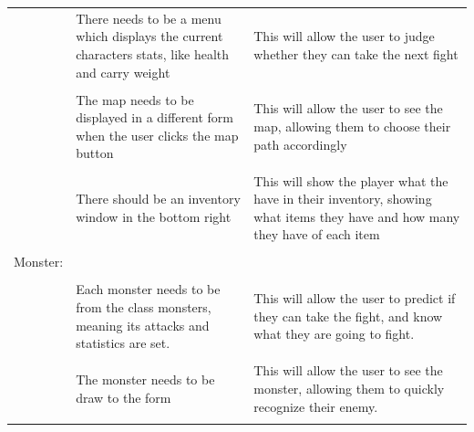\documentclass[12pt]{article}
\begin{document}
\begin{tabularx}{\linewidth}{XXX}
                        & There needs to be a menu which displays the current characters stats, like health and carry weight & This will allow the user to judge whether they can take the next fight                                                                                                                                                                             \\\\
                        & The map needs to be displayed in a different form when the user clicks the map button              & This will allow the user to see the map, allowing them to choose their path accordingly                                                                                                                                                            \\\\
                        & There should be an inventory window in the bottom right                                            & This will show the player what the have in their inventory, showing what items they have and how many they have of each item                                                                                                                       \\\\
Monster:                &                                                                                                    &                                                                                                                                                                                                                                                    \\\\
                        & Each monster needs to be from the class monsters, meaning its attacks and statistics are set.      & This will allow the user to predict if they can take the fight, and know what they are going to fight.                                                                                                                                             \\\\
                        & The monster needs to be draw to the form                                                           & This will allow the user to see the monster, allowing them to quickly recognize their enemy.                                                                                                                                                       \\\\

\end{tabularx}
\end{document}

